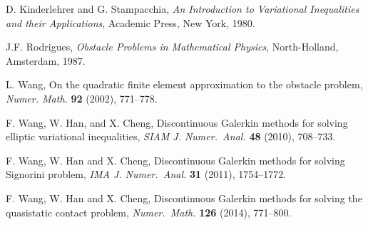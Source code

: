 \documentclass[12pt]{article}
\begin{document}
\begin{thebibliography}{10}


D. Kinderlehrer and G. Stampacchia, \emph{An Introduction to Variational
Inequalities and their Applications}, Academic Press, New York, 1980.

%

J.F. Rodrigues, \emph{Obstacle Problems in Mathematical Physics}, North-Holland, Amsterdam, 1987.


 L. Wang, On the quadratic finite element approximation
to the obstacle problem, \emph{Numer. Math.} {\bf 92} (2002),
771--778.

F. Wang, W. Han, and X. Cheng, Discontinuous Galerkin methods for solving elliptic 
variational inequalities, \emph{SIAM J. Numer.\ Anal.} {\bf 48} (2010), 708--733.

F. Wang, W. Han and X. Cheng, Discontinuous Galerkin methods for solving Signorini problem, 
\emph{IMA J. Numer.\ Anal.} {\bf 31} (2011), 1754--1772.

F. Wang, W. Han and X. Cheng, Discontinuous Galerkin methods for solving the quasistatic 
contact problem, \emph{Numer.\ Math.} {\bf 126} (2014), 771--800. 




\end{thebibliography}
\end{document}
